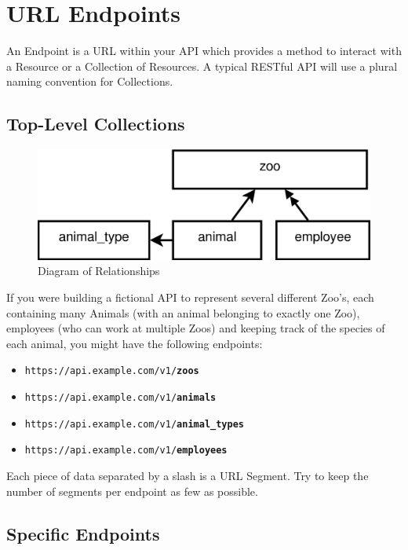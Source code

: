 \documentclass{book}
\begin{document}
\section{URL Endpoints}

An Endpoint is a URL within your API which provides a method to interact with a Resource or a Collection of Resources. A typical RESTful API will use a plural naming convention for Collections.

\subsection{Top-Level Collections}

\begin{figure}[ht!]
\centering
\includegraphics[scale=.5]{images/zoo-relationships.eps}
\caption{Diagram of Relationships}
\label{fig:zoorelationships}
\end{figure}

If you were building a fictional API to represent several different Zoo's, each containing many Animals (with an animal belonging to exactly one Zoo), employees (who can work at multiple Zoos) and keeping track of the species of each animal, you might have the following endpoints:

\begin{itemize}
\item \texttt{https://api.example.com/v1/\textbf{zoos}}
\item \texttt{https://api.example.com/v1/\textbf{animals}}
\item \texttt{https://api.example.com/v1/\textbf{animal\_types}}
\item \texttt{https://api.example.com/v1/\textbf{employees}}
\end{itemize}

Each piece of data separated by a slash is a URL Segment. Try to keep the number of segments per endpoint as few as possible.

\subsection{Specific Endpoints}
\end{document}
